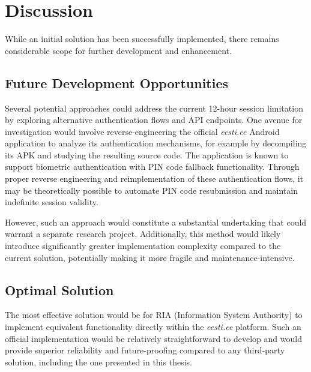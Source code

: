 \section{Discussion}

While an initial solution has been successfully implemented, there remains considerable scope for further development and enhancement.

\subsection{Future Development Opportunities}

Several potential approaches could address the current 12-hour session limitation by exploring alternative authentication flows and API endpoints. One avenue for investigation would involve reverse-engineering the official \textit{eesti.ee} Android application to analyze its authentication mechanisms, for example by decompiling its APK and studying the resulting source code. The application is known to support biometric authentication with PIN code fallback functionality. Through proper reverse engineering and reimplementation of these authentication flows, it may be theoretically possible to automate PIN code resubmission and maintain indefinite session validity.

However, such an approach would constitute a substantial undertaking that could warrant a separate research project. Additionally, this method would likely introduce significantly greater implementation complexity compared to the current solution, potentially making it more fragile and maintenance-intensive.

\subsection{Optimal Solution}

The most effective solution would be for RIA (Information System Authority) to implement equivalent functionality directly within the \textit{eesti.ee} platform. Such an official implementation would be relatively straightforward to develop and would provide superior reliability and future-proofing compared to any third-party solution, including the one presented in this thesis.